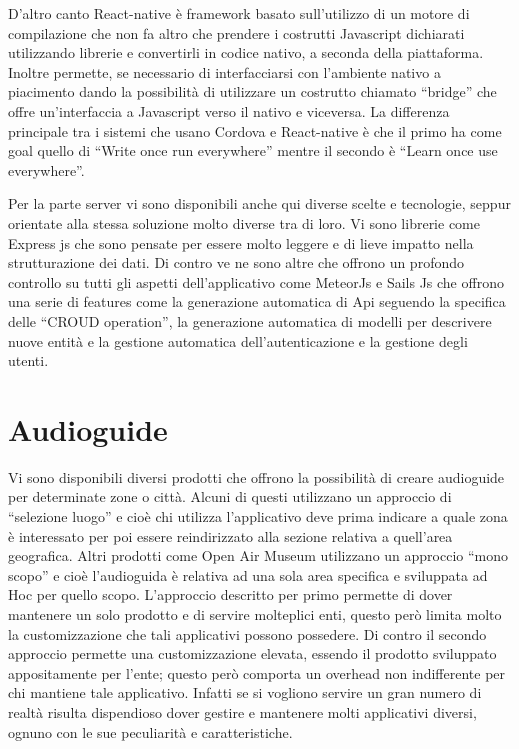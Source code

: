 D’altro canto React-native è framework basato sull’utilizzo di un motore di compilazione che non fa altro che prendere i costrutti Javascript dichiarati utilizzando librerie e convertirli in codice nativo, a seconda della piattaforma. Inoltre permette, se necessario di interfacciarsi con l’ambiente nativo a piacimento dando la possibilità di utilizzare un costrutto chiamato “bridge” che offre un’interfaccia a Javascript verso il nativo e viceversa. La differenza principale tra i sistemi che usano Cordova e React-native è che il primo ha come goal quello di “Write once run everywhere” mentre il secondo è “Learn once use everywhere”.\vspace{5mm}

Per la parte server vi sono disponibili anche qui diverse scelte e tecnologie, seppur orientate alla stessa soluzione molto diverse tra di loro. Vi sono librerie come Express js che sono pensate per essere molto leggere e di lieve impatto nella strutturazione dei dati. Di contro ve ne sono altre che offrono un profondo controllo su tutti gli aspetti dell’applicativo come MeteorJs e Sails Js che offrono una serie di features come la generazione automatica di Api seguendo la specifica delle “CROUD operation”, la generazione automatica di modelli per descrivere nuove entità e la gestione automatica dell’autenticazione e la gestione degli utenti.\vspace{5mm}

\section{Audioguide}\vspace{5mm}

Vi sono disponibili diversi prodotti che offrono la possibilità di creare audioguide per determinate zone o città. Alcuni di questi utilizzano un approccio di “selezione luogo” e cioè chi utilizza l’applicativo deve prima indicare a quale zona è interessato per poi essere reindirizzato alla sezione relativa a quell’area geografica. Altri prodotti come Open Air Museum utilizzano un approccio “mono scopo” e cioè l’audioguida è relativa ad una sola area specifica e sviluppata ad Hoc per quello scopo. L’approccio descritto per primo permette di dover mantenere un solo prodotto e di servire molteplici enti, questo però limita molto la customizzazione che tali applicativi possono possedere. Di contro il secondo approccio permette una customizzazione elevata, essendo il prodotto sviluppato appositamente per l’ente; questo però comporta un overhead non indifferente per chi mantiene tale applicativo. Infatti se si vogliono servire un gran numero di realtà risulta dispendioso dover gestire e mantenere molti applicativi diversi, ognuno con le sue peculiarità e caratteristiche.\vspace{5mm}

